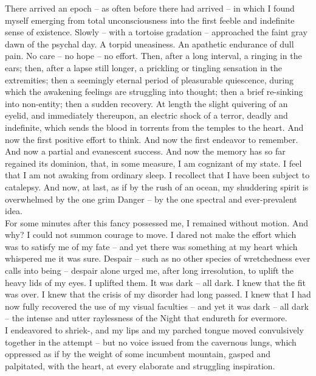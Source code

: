 \documentclass[12pt,a4paper]{article}
\begin{document}
There arrived an epoch -- as often before there had arrived -- in which I found myself emerging from total unconsciousness into the first feeble and indefinite sense of existence. Slowly -- with a tortoise gradation -- approached the faint gray dawn of the psychal day. A torpid uneasiness. An apathetic endurance of dull pain. No care -- no hope -- no effort. Then, after a long interval, a ringing in the ears; then, after a lapse still longer, a prickling or tingling sensation in the extremities; then a seemingly eternal period of pleasurable quiescence, during which the awakening feelings are struggling into thought; then a brief re-sinking into non-entity; then a sudden recovery. At length the slight quivering of an eyelid, and immediately thereupon, an electric shock of a terror, deadly and indefinite, which sends the blood in torrents from the temples to the heart. And now the first positive effort to think. And now the first endeavor to remember. And now a partial and evanescent success. And now the memory has so far regained its dominion, that, in some measure, I am cognizant of my state. I feel that I am not awaking from ordinary sleep. I recollect that I have been subject to catalepsy. And now, at last, as if by the rush of an ocean, my shuddering spirit is overwhelmed by the one grim Danger -- by the one spectral and ever-prevalent idea. \\

For some minutes after this fancy possessed me, I remained without motion. And why? I could not summon courage to move. I dared not make the effort which was to satisfy me of my fate -- and yet there was something at my heart which whispered me it was sure. Despair -- such as no other species of wretchedness ever calls into being -- despair alone urged me, after long irresolution, to uplift the heavy lids of my eyes. I uplifted them. It was dark -- all dark. I knew that the fit was over. I knew that the crisis of my disorder had long passed. I knew that I had now fully recovered the use of my visual faculties -- and yet it was dark -- all dark -- the intense and utter raylessness of the Night that endureth for evermore. \\

I endeavored to shriek-, and my lips and my parched tongue moved convulsively together in the attempt -- but no voice issued from the cavernous lungs, which oppressed as if by the weight of some incumbent mountain, gasped and palpitated, with the heart, at every elaborate and struggling inspiration. \\
\end{document}
